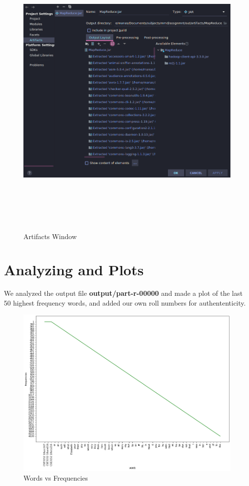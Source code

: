 \documentclass[10pt]{report}
\begin{document}
\begin{figure}[h]
        \includegraphics[height=15cm]{artifact.png}
        \centering
        \caption{Artifacts Window}
        \centering
\end{figure}
\clearpage

\section{Analyzing and Plots}
We analyzed the output file \textbf{output/part-r-00000} and made a plot of the
last 50 highest frequency words, and added our own roll numbers for authententicity.

\begin{figure}[h]
        \includegraphics[width=15cm]{plot.png}
        \centering
        \caption{Words vs Frequencies}
        \centering
\end{figure}
\end{document}
